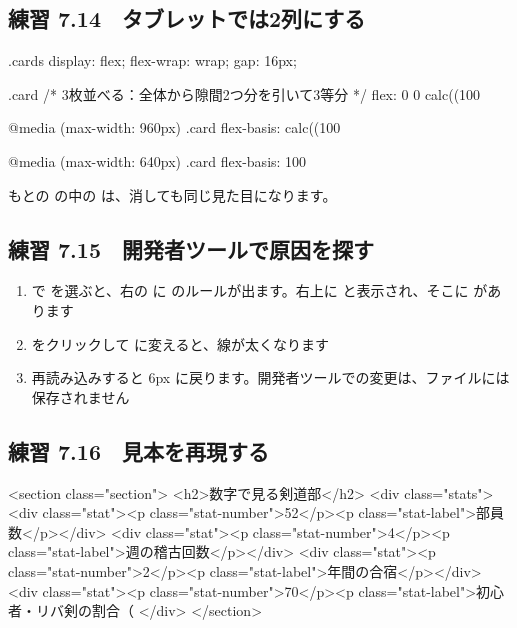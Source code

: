 \subsection*{練習 7.14　タブレットでは2列にする}
\begin{Piton}[language=code]
.cards {
  display: flex;
  flex-wrap: wrap;
  gap: 16px;
}

.card {
  /* 3枚並べる：全体から隙間2つ分を引いて3等分 */
  flex: 0 0 calc((100%
}

@media (max-width: 960px) {
  .card {
    flex-basis: calc((100%
  }
}

@media (max-width: 640px) {
  .card {
    flex-basis: 100%
  }
}
\end{Piton}
もとの  の中の  は、消しても同じ見た目になります。

\subsection*{練習 7.15　開発者ツールで原因を探す}
\begin{enumerate}
  \item {} で  を選ぶと、右の  に  のルールが出ます。右上に  と表示され、そこに  があります
  \item \code{6px} をクリックして \code{12px} に変えると、線が太くなります
  \item 再読み込みすると 6px に戻ります。開発者ツールでの変更は、ファイルには保存されません
\end{enumerate}

\subsection*{練習 7.16　見本を再現する}
\begin{Piton}[language=code]
<section class="section">
  <h2>数字で見る剣道部</h2>
  <div class="stats">
    <div class="stat"><p class="stat-number">52</p><p class="stat-label">部員数</p></div>
    <div class="stat"><p class="stat-number">4</p><p class="stat-label">週の稽古回数</p></div>
    <div class="stat"><p class="stat-number">2</p><p class="stat-label">年間の合宿</p></div>
    <div class="stat"><p class="stat-number">70</p><p class="stat-label">初心者・リバ剣の割合（%
  </div>
</section>
\end{Piton}

